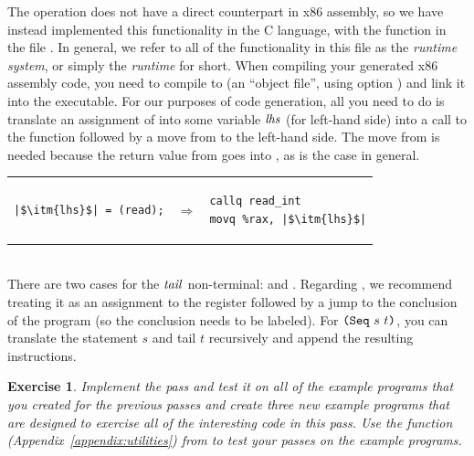\documentclass[11pt]{book}
\newtheorem{exercise}[theorem]{Exercise}
\begin{document}
The  operation does not have a direct counterpart in x86
assembly, so we have instead implemented this functionality in the C
language, with the function  in the file
. In general, we refer to all of the functionality in
this file as the \emph{runtime system}, or simply the \emph{runtime}
for short. When compiling your generated x86 assembly code, you need
to compile  to  (an ``object file'',
using  option ) and link it into the
executable. For our purposes of code generation, all you need to do is
translate an assignment of  into some variable $\mathit{lhs}$
(for left-hand side) into a call to the  function
followed by a move from  to the left-hand side.  The move
from  is needed because the return value from
 goes into , as is the case in general.  \\
\begin{tabular}{lll}
\begin{minipage}{0.4\textwidth}
\begin{lstlisting}
|$\itm{lhs}$| = (read);
\end{lstlisting}
\end{minipage}
&
$\Rightarrow$
&
\begin{minipage}{0.4\textwidth}
\begin{lstlisting}
callq read_int
movq %rax, |$\itm{lhs}$|
\end{lstlisting}
\end{minipage}
\end{tabular} \\

There are two cases for the $\mathit{tail}$ non-terminal:  and
. Regarding , we recommend treating it as an
assignment to the  register followed by a jump to the
conclusion of the program (so the conclusion needs to be labeled).
For $\texttt{(Seq}~s~t\texttt{)}$, you can translate the statement $s$ and tail $t$
recursively and append the resulting instructions.

\begin{exercise}
\normalfont
Implement the  pass and test it on all of the
example programs that you created for the previous passes and create
three new example programs that are designed to exercise all of the
interesting code in this pass. Use the  function
(Appendix~\ref{appendix:utilities}) from  to test
your passes on the example programs.
\end{exercise}
\end{document}
